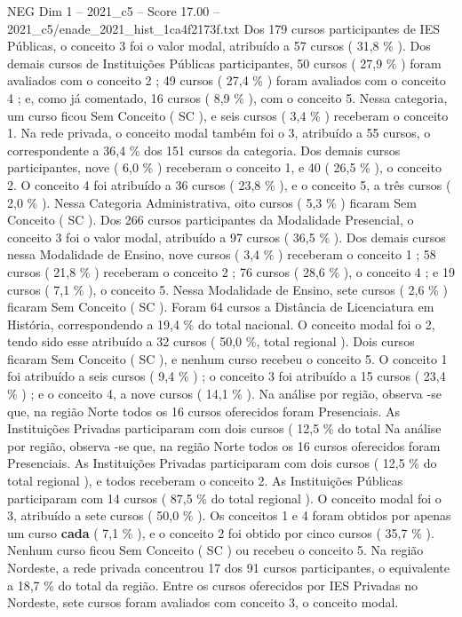 \begin{textsample}{NEG Dim 1 – 2021\_c5 – Score 17.00 – 2021\_c5/enade\_2021\_hist\_1ca4f2173f.txt}
Dos 179 cursos participantes de IES Públicas, o conceito 3 foi o valor modal, atribuído a 57 cursos ( 31,8 \% ).
Dos demais cursos de Instituições Públicas participantes, 50 cursos ( 27,9 \% ) foram avaliados com o conceito 2 ; 49 cursos ( 27,4 \% ) foram avaliados com o conceito 4 ; e, como já comentado, 16 cursos ( 8,9 \% ), com o conceito 5.
Nessa categoria, um curso ficou Sem Conceito ( SC ), e seis cursos ( 3,4 \% ) receberam o conceito 1.
Na rede privada, o conceito modal também foi o 3, atribuído a 55 cursos, o correspondente a 36,4 \% dos 151 cursos da categoria.
Dos demais cursos participantes, nove ( 6,0 \% ) receberam o conceito 1, e 40 ( 26,5 \% ), o conceito 2.
O conceito 4 foi atribuído a 36 cursos ( 23,8 \% ), e o conceito 5, a três cursos ( 2,0 \% ).
Nessa Categoria Administrativa, oito cursos ( 5,3 \% ) ficaram Sem Conceito ( SC ).
Dos 266 cursos participantes da Modalidade Presencial, o conceito 3 foi o valor modal, atribuído a 97 cursos ( 36,5 \% ).
Dos demais cursos nessa Modalidade de Ensino, nove cursos ( 3,4 \% ) receberam o conceito 1 ; 58 cursos ( 21,8 \% ) receberam o conceito 2 ; 76 cursos ( 28,6 \% ), o conceito 4 ; e 19 cursos ( 7,1 \% ), o conceito 5.
Nessa Modalidade de Ensino, sete cursos ( 2,6 \% ) ficaram Sem Conceito ( SC ).
Foram 64 cursos a Distância de Licenciatura em História, correspondendo a 19,4 \% do total nacional.
O conceito modal foi o 2, tendo sido esse atribuído a 32 cursos ( 50,0 \%, total regional ).
Dois cursos ficaram Sem Conceito ( SC ), e nenhum curso recebeu o conceito 5.
O conceito 1 foi atribuído a seis cursos ( 9,4 \% ) ; o conceito 3 foi atribuído a 15 cursos ( 23,4 \% ) ; e o conceito 4, a nove cursos ( 14,1 \% ).
Na análise por região, observa -se que, na região Norte todos os 16 cursos oferecidos foram Presenciais.
As Instituições Privadas participaram com dois cursos ( 12,5 \% do total Na análise por região, observa -se que, na região Norte todos os 16 cursos oferecidos foram Presenciais.
As Instituições Privadas participaram com dois cursos ( 12,5 \% do total regional ), e todos receberam o conceito 2.
As Instituições Públicas participaram com 14 cursos ( 87,5 \% do total regional ).
O conceito modal foi o 3, atribuído a sete cursos ( 50,0 \% ).
Os conceitos 1 e 4 foram obtidos por apenas um curso \textbf{cada} ( 7,1 \% ), e o conceito 2 foi obtido por cinco cursos ( 35,7 \% ).
Nenhum curso ficou Sem Conceito ( SC ) ou recebeu o conceito 5.
Na região Nordeste, a rede privada concentrou 17 dos 91 cursos participantes, o equivalente a 18,7 \% do total da região.
Entre os cursos oferecidos por IES Privadas no Nordeste, sete cursos foram avaliados com conceito 3, o conceito modal.

\end{textsample}
